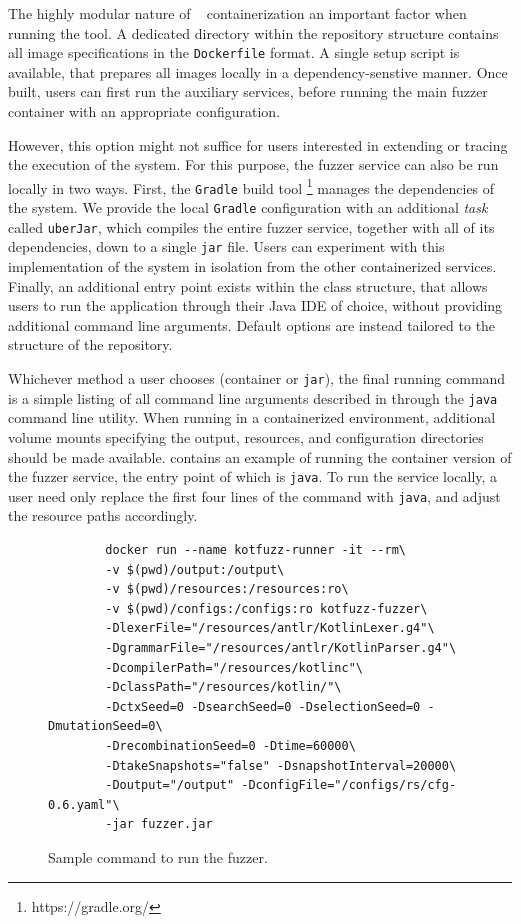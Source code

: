 The highly modular nature of \kf~ containerization an important factor when running the tool.
A dedicated directory within the repository structure contains
all image specifications in the \texttt{Dockerfile} format.
A single setup script is available, that prepares all images locally in
a dependency-senstive manner.
Once built, users can first run the auxiliary services,
before running the main fuzzer container with an appropriate configuration.


However, this option might not suffice for users interested
in extending or tracing the execution of the system.
For this purpose, the fuzzer service can also be run locally
in two ways.
First, the \texttt{Gradle} build tool \footnote{https://gradle.org/}
manages the dependencies of the system.
We provide the local \texttt{Gradle} configuration
with an additional \textit{task} called \texttt{uberJar},
which compiles the entire fuzzer service, together with
all of its dependencies, down to a single \texttt{jar} file.
Users can experiment with this implementation of the system
in isolation from the other containerized services.
Finally, an additional entry point exists
within the class structure, that allows users
to run the application through their Java \gls{IDE} of choice,
without providing additional command line arguments.
Default options are instead tailored to the structure of the repository.

Whichever method a user chooses (container or \texttt{jar}),
the final running command is a simple listing of all command line arguments
described in  through the \texttt{java} command line utility.
When running in a containerized environment, additional volume mounts
specifying the output, resources, and configuration directories should be 
made available.
 contains an example of running
the container version of the fuzzer service, the entry point
of which is \texttt{java}.
To run the service locally, a user need only
replace the first four lines of the command with \texttt{java},
and adjust the resource paths accordingly.

\begin{figure}
    \centering
    \begin{verbatim}
        docker run --name kotfuzz-runner -it --rm\
        -v $(pwd)/output:/output\
        -v $(pwd)/resources:/resources:ro\
        -v $(pwd)/configs:/configs:ro kotfuzz-fuzzer\
        -DlexerFile="/resources/antlr/KotlinLexer.g4"\
        -DgrammarFile="/resources/antlr/KotlinParser.g4"\
        -DcompilerPath="/resources/kotlinc"\
        -DclassPath="/resources/kotlin/"\
        -DctxSeed=0 -DsearchSeed=0 -DselectionSeed=0 -DmutationSeed=0\
        -DrecombinationSeed=0 -Dtime=60000\
        -DtakeSnapshots="false" -DsnapshotInterval=20000\
        -Doutput="/output" -DconfigFile="/configs/rs/cfg-0.6.yaml"\
        -jar fuzzer.jar
    \end{verbatim}
    \caption{Sample command to run the fuzzer.}
    \label{fig:run_cmd}
\end{figure}